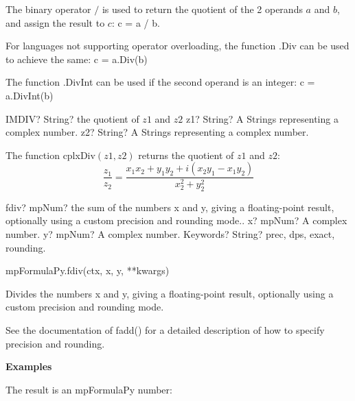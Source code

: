 \vspace{0.3cm}
The binary operator $/$ is used to return the quotient of the 2 operands $a$ and $b$, and assign the result to $c$: \textsf{c = a / b}.

For languages not supporting operator overloading, the function \textsf{.Div} can be used to achieve the same: \textsf{c = a.Div(b)}

The function \textsf{.DivInt}  can be used if the second operand is an integer: \textsf{c = a.DivInt(b)}


\vspace{0.6cm}
\begin{mpFunctionsExtract}
	\mpWorksheetFunctionTwoNotImplemented
	{IMDIV? String? the quotient of $z1$ and $z2$}
	{z1? String? A Strings representing a complex number.}
	{z2? String? A Strings representing a complex number.}
\end{mpFunctionsExtract}


\vspace{0.3cm}
The function \textsf{cplxDiv$(z1, z2)$} returns the quotient of $z1$ and $z2$: 
\begin{equation}
	\frac{z_1}{z_2} = \frac{x_1 x_2 + y_1 y_2 + i(x_2 y_1 - x_1 y_2)}{x_2^2 + y_2^2}
\end{equation}



\vspace{0.3cm}
\begin{mpFunctionsExtract}
	\mpFunctionThree
	{fdiv? mpNum? the sum of the numbers x and y, giving a floating-point result, optionally using a custom precision and rounding mode..}
	{x? mpNum? A complex number.}
	{y? mpNum? A complex number.}
	{Keywords? String? prec, dps, exact, rounding.}	
\end{mpFunctionsExtract}

mpFormulaPy.fdiv(ctx, x, y, **kwargs)

\vpara
Divides the numbers x and y, giving a floating-point result, optionally using a custom precision and rounding mode.

\vpara
See the documentation of fadd() for a detailed description of how to specify precision and rounding.

\vpara
\textbf{Examples}

The result is an mpFormulaPy number:


